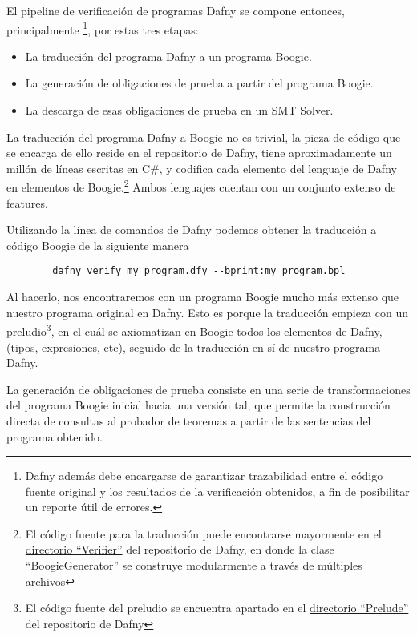 \documentclass[12pt, a4paper, openany, fleqn]{book}
\begin{document}
    El pipeline de verificación de programas Dafny se compone entonces, principalmente \footnote{Dafny además debe encargarse de garantizar trazabilidad entre el código fuente original y los resultados de la verificación obtenidos, a fin de posibilitar un reporte útil de errores.}, por estas tres etapas:
    \begin{itemize}
        \item La traducción del programa Dafny a un programa Boogie.
        \item La generación de obligaciones de prueba a partir del programa Boogie.
        \item La descarga de esas obligaciones de prueba en un SMT Solver.
    \end{itemize}

    La traducción del programa Dafny a Boogie no es trivial, la pieza de código que se encarga de ello reside en el repositorio de Dafny, tiene aproximadamente un millón de líneas escritas en C\#, y codifica cada elemento del lenguaje de Dafny en elementos de Boogie.\footnote{El código fuente para la traducción puede encontrarse mayormente en el \href{https://github.com/dafny-lang/dafny/tree/v4.7.0/Source/DafnyCore/Verifier}{directorio ``Verifier''} del repositorio de Dafny, en donde la clase ``BoogieGenerator'' se construye modularmente a través de múltiples archivos } Ambos lenguajes cuentan con un conjunto extenso de features.

    Utilizando la línea de comandos de Dafny podemos obtener la traducción a código Boogie de la siguiente manera
    \begin{verbatim}
        dafny verify my_program.dfy --bprint:my_program.bpl
    \end{verbatim}
    Al hacerlo, nos encontraremos con un programa Boogie mucho más extenso que nuestro programa original en Dafny. Esto es porque la traducción empieza con un preludio\footnote{El código fuente del preludio se encuentra apartado en el \href{https://github.com/dafny-lang/dafny/blob/v4.7.0/Source/DafnyCore/DafnyPrelude.bpl}{directorio ``Prelude''} del repositorio de Dafny}, en el cuál se axiomatizan en Boogie todos los elementos de Dafny, (tipos, expresiones, etc), seguido de la traducción en sí de nuestro programa Dafny.

    La generación de obligaciones de prueba consiste en una serie de transformaciones del programa Boogie inicial hacia una versión tal, que permite la construcción directa de consultas al probador de teoremas a partir de las sentencias del programa obtenido.
\end{document}
